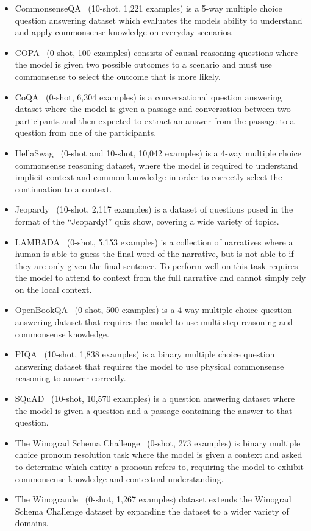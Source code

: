\documentclass{article}
\begin{document}
\begin{itemize}
    \item
    CommonsenseQA~\citep{talmor-etal-2019-commonsenseqa} (10-shot, 1,221 examples) is a 5-way multiple choice question answering dataset which evaluates the models ability to understand and apply commonsense knowledge on everyday scenarios.
    \item
    COPA~\citep{copa} (0-shot, 100 examples) consists of causal reasoning questions where the model is given two possible outcomes to a scenario and must use commonsense to select the outcome that is more likely.
    \item
    CoQA~\citep{reddy-etal-2019-coqa} (0-shot, 6,304 examples) is a conversational question answering dataset where the model is given a passage and conversation between two participants and then expected to extract an answer from the passage to a question from one of the participants.
    \item
    HellaSwag~\citep{hellaswag} (0-shot and 10-shot, 10,042 examples) is a 4-way multiple choice commonsense reasoning dataset, where the model is required to understand implicit context and common knowledge in order to correctly select the continuation to a context.
    \item
    Jeopardy~\citep{kaggle200000Jeopardy} (10-shot, 2,117 examples) is a dataset of questions posed in the format of the ``Jeopardy!'' quiz show, covering a wide variety of topics.
    \item
    LAMBADA~\citep{lambada} (0-shot, 5,153 examples) is a collection of narratives where a human is able to guess the final word of the narrative, but is not able to if they are only given the final sentence. To perform well on this task requires the model to attend to context from the full narrative and cannot simply rely on the local context.
    \item
    OpenBookQA~\citep{OpenBookQA2018} (0-shot, 500 examples) is a 4-way multiple choice question answering dataset that requires the model to use multi-step reasoning and commonsense knowledge.
    \item
    PIQA~\citep{piqa} (10-shot, 1,838 examples) is a binary multiple choice question answering dataset that requires the model to use physical commonsense reasoning to answer correctly.
    \item
    SQuAD~\citep{squad} (10-shot, 10,570 examples) is a question answering dataset where the model is given a question and a passage containing the answer to that question.
    \item
    The Winograd Schema Challenge~\citep{winograd} (0-shot, 273 examples) is binary multiple choice pronoun resolution task where the model is given a context and asked to determine which entity a pronoun refers to, requiring the model to exhibit commonsense knowledge and contextual understanding.
    \item
    The Winogrande~\citep{sakaguchi2019winogrande} (0-shot, 1,267 examples) dataset extends the Winograd Schema Challenge dataset by expanding the dataset to a wider variety of domains.
\end{itemize}
\end{document}
